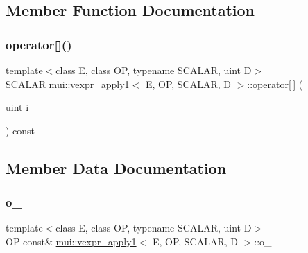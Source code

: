 \subsection{Member Function Documentation}
\mbox{\label{structmui_1_1vexpr__apply1_aacf9277f3f001a6c4870c5ebdf4b6395}} 
\subsubsection{\texorpdfstring{operator[]()}{operator[]()}}
{\footnotesize\ttfamily template$<$class E, class OP, typename S\+C\+A\+L\+AR, uint D$>$ \\
S\+C\+A\+L\+AR \hyperlink{structmui_1_1vexpr__apply1}{mui\+::vexpr\+\_\+apply1}$<$ E, OP, S\+C\+A\+L\+AR, D $>$\+::operator\mbox{[}$\,$\mbox{]} (\begin{DoxyParamCaption}\item[{\hyperlink{namespacemui_af15a3e7188a2117fb9965277bb0cacd2}{uint}}]{i }\end{DoxyParamCaption}) const\hspace{0.3cm}{\ttfamily [inline]}}



\subsection{Member Data Documentation}
\mbox{\label{structmui_1_1vexpr__apply1_ac876a26885617eb0188d4c22bd0531ff}} 
\subsubsection{\texorpdfstring{o\+\_\+}{o\_}}
{\footnotesize\ttfamily template$<$class E, class OP, typename S\+C\+A\+L\+AR, uint D$>$ \\
OP const\& \hyperlink{structmui_1_1vexpr__apply1}{mui\+::vexpr\+\_\+apply1}$<$ E, OP, S\+C\+A\+L\+AR, D $>$\+::o\+\_\+\hspace{0.3cm}{\ttfamily [protected]}}

\mbox{\label{structmui_1_1vexpr__apply1_a3b939200baed0b2c6838a41704b2fa2d}} 
